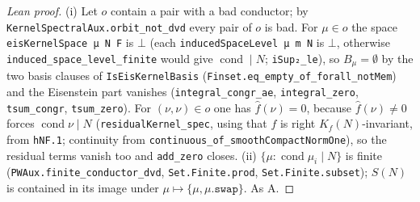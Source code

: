 \begin{proof}[Lean proof]
(i) Let $o$ contain a pair with a bad conductor; by \texttt{KernelSpectralAux.orbit\_not\_dvd} every pair of $o$ is bad. For $\mu\in o$ the space \texttt{eisKernelSpace μ N F} is $\bot$ (each \texttt{inducedSpaceLevel μ m N} is $\bot$, otherwise \texttt{induced\_space\_level\_finite} would give $\operatorname{cond}\mid N$; \texttt{iSup₂\_le}), so $B_\mu=\emptyset$ by the two basis clauses of \texttt{IsEisKernelBasis} (\texttt{Finset.eq\_empty\_of\_forall\_notMem}) and the Eisenstein part vanishes (\texttt{integral\_congr\_ae}, \texttt{integral\_zero}, \texttt{tsum\_congr}, \texttt{tsum\_zero}). For $(\nu,\nu)\in o$ one has $\hat f(\nu)=0$, because $\hat f(\nu)\ne0$ forces $\operatorname{cond}\nu\mid N$ (\texttt{residualKernel\_spec}, using that $f$ is right $K_f(N)$-invariant, from \texttt{hNF.1}; continuity from \texttt{continuous\_of\_smoothCompactNormOne}), so the residual terms vanish too and \texttt{add\_zero} closes. (ii) $\{\mu:\operatorname{cond}\mu_i\mid N\}$ is finite (\texttt{PWAux.finite\_conductor\_dvd}, \texttt{Set.Finite.prod}, \texttt{Set.Finite.subset}); $S(N)$ is contained in its image under $\mu\mapsto\{\mu,\mu.\texttt{swap}\}$. As A.
\end{proof}

